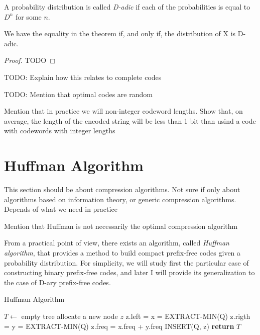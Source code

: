 \begin{definition}
A probability distribution is called \emph{D-adic} if each of the probabilities is equal to $D^n$ for some $n$.
\end{definition}

\begin{corollary}
We have the equality in the theorem if, and only if, the distribution of X is D-adic.
\end{corollary}
\begin{proof}
{\color{red} TODO}
\end{proof}

{\color{red} TODO: Explain how this relates to complete codes}

{\color{red} TODO: Mention that optimal codes are random}

{\color{red} Mention that in practice we will non-integer codeword lengths. Show that, on average, the length of the encoded string will be less than 1 bit than usind a code with codewords with integer lengths} 

%
%

\section{Huffman Algorithm}
\label{sec:Huffman-Algorithm}

{\color{red} This section should be about compression algorithms. Not sure if only about algorithms based on information theory, or generic compression algorithms. Depends of what we need in practice}

{\color{red} Mention that Huffman is not necessarily the optimal compression algorithm}

From a practical point of view, there exists an algorithm, called \emph{Huffman algorithm}, that provides a method to build compact prefix-free codes given a probability distribution. For simplicity, we will study first the particular case of constructing binary prefix-free codes, and later I will provide its generalization to the case of D-ary prefix-free codes.

\begin{algorithm}
\caption{Huffman Algorithm}
\label{alg:Huffman}
\begin{algorithmic}
    \State $T \gets$ empty tree
        \State allocate a new node $z$
        \State z.left = x = EXTRACT-MIN(Q)
        \State z.rigth = y = EXTRACT-MIN(Q)
        \State z.freq = x.freq + y.freq
        \State INSERT(Q, z)
    \EndFor
    \State \textbf{return} $T$
\EndProcedure
\end{algorithmic}
\end{algorithm}

